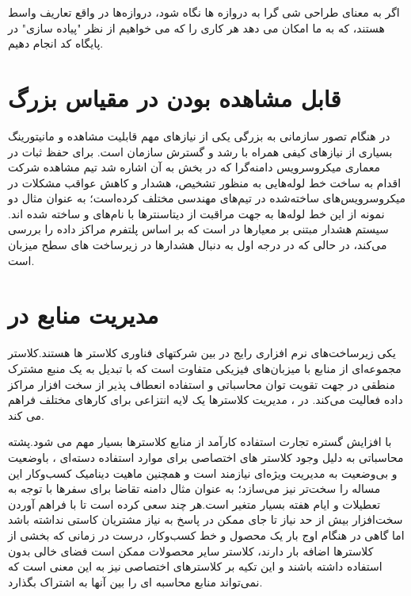 اگر به معنای طراحی شی گرا به دروازه ها نگاه شود، دروازه‌ها در واقع تعاریف واسط هستند، که به ما امکان می دهد هر کاری را که می خواهیم از نظر "پیاده سازی" در پایگاه کد انجام دهیم.

\section{قابل مشاهده بودن در مقیاس بزرگ}
در هنگام تصور سازمانی به بزرگی  یکی از نیاز‌های مهم قابلیت مشاهده و مانیتورینگ بسیاری از نیاز‌های کیفی همراه با رشد و گسترش سازمان است. برای حفظ ثبات در معماری میکروسرویس دامنه‌گرا که در بخش \cite{domainmicroservice} به آن اشاره شد تیم مشاهده شرکت  اقدام به ساخت خط لوله‌هایی به منظور تشخیص، هشدار و کاهش عواقب مشکلات در میکروسرویس‌های ساخته‌شده در تیم‌های مهندسی مختلف کرده‌است؛ به عنوان مثال دو نمونه از این خط لوله‌ها به جهت مراقبت از دیتاسنتر‌ها با نام‌های  و  ساخته شده اند. سیستم هشدار مبتنی بر معیار‌ها در  است که بر اساس پلتفرم  \cite{m3_uber} مراکز داده را بررسی می‌کند، در حالی که  در درجه اول به دنبال هشدارها در زیرساخت های سطح میزبان است.

\section{مدیریت منابع در }
یکی زیرساخت‌های نرم افزاری رایج در بین شرکتهای فناوری کلاستر ها هستند.کلاستر مجموعه‌ای از منابع با میزبان‌های فیزیکی متفاوت است که با تبدیل به یک منبع مشترک منطقی در جهت تقویت توان محاسباتی و استفاده انعطاف پذیر از سخت افزار مراکز داده فعالیت می‌کند. در ، مدیریت کلاسترها یک لایه انتزاعی برای کارهای مختلف فراهم می کند\cite{resource_uber}.

با افزایش گستره تجارت  استفاده کارآمد از منابع کلاستر‌ها بسیار مهم می شود.پشته محاسباتی  به دلیل وجود کلاستر های اختصاصی برای موارد استفاده دسته‌ای ، باوضعیت و بی‌وضعیت به مدیریت ویژه‌ای نیازمند است و همچنین ماهیت دینامیک کسب‌و‌کار  این مساله را سخت‌تر نیز می‌سازد؛ به عنوان مثال دامنه تقاضا برای سفرها با توجه به تعطیلات و ایام هفته بسیار متغیر است.هر چند  سعی کرده است تا با فراهم آوردن سخت‌افزار بیش از حد نیاز تا جای ممکن در پاسخ به نیاز مشتریان کاستی نداشته باشد اما گاهی در هنگام اوج بار یک محصول و خط کسب‌و‌کار، درست در زمانی که بخشی از کلاستر‌ها اضافه بار دارند، کلاستر سایر محصولات ممکن است فضای خالی بدون استفاده داشته باشند و این تکیه بر کلاستر‌های اختصاصی نیز به این معنی است که   نمی‌تواند منابع محاسبه ای را بین آنها به اشتراک بگذارد.


